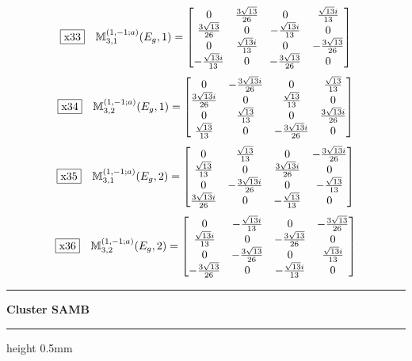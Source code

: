 \documentclass[fleqn,10pt,landscape]{jsarticle}
\begin{document}
\begin{dmath*}
\fbox{x33}\quad \mathbb{M}_{3,1}^{(1,-1;a)}(E_{g},1)=\begin{bmatrix} 0 & \frac{3 \sqrt{13}}{26} & 0 & \frac{\sqrt{13} i}{13} \\ \frac{3 \sqrt{13}}{26} & 0 & - \frac{\sqrt{13} i}{13} & 0 \\ 0 & \frac{\sqrt{13} i}{13} & 0 & - \frac{3 \sqrt{13}}{26} \\ - \frac{\sqrt{13} i}{13} & 0 & - \frac{3 \sqrt{13}}{26} & 0 \end{bmatrix}
\end{dmath*}
\begin{dmath*}
\fbox{x34}\quad \mathbb{M}_{3,2}^{(1,-1;a)}(E_{g},1)=\begin{bmatrix} 0 & - \frac{3 \sqrt{13} i}{26} & 0 & \frac{\sqrt{13}}{13} \\ \frac{3 \sqrt{13} i}{26} & 0 & \frac{\sqrt{13}}{13} & 0 \\ 0 & \frac{\sqrt{13}}{13} & 0 & \frac{3 \sqrt{13} i}{26} \\ \frac{\sqrt{13}}{13} & 0 & - \frac{3 \sqrt{13} i}{26} & 0 \end{bmatrix}
\end{dmath*}
\begin{dmath*}
\fbox{x35}\quad \mathbb{M}_{3,1}^{(1,-1;a)}(E_{g},2)=\begin{bmatrix} 0 & \frac{\sqrt{13}}{13} & 0 & - \frac{3 \sqrt{13} i}{26} \\ \frac{\sqrt{13}}{13} & 0 & \frac{3 \sqrt{13} i}{26} & 0 \\ 0 & - \frac{3 \sqrt{13} i}{26} & 0 & - \frac{\sqrt{13}}{13} \\ \frac{3 \sqrt{13} i}{26} & 0 & - \frac{\sqrt{13}}{13} & 0 \end{bmatrix}
\end{dmath*}
\begin{dmath*}
\fbox{x36}\quad \mathbb{M}_{3,2}^{(1,-1;a)}(E_{g},2)=\begin{bmatrix} 0 & - \frac{\sqrt{13} i}{13} & 0 & - \frac{3 \sqrt{13}}{26} \\ \frac{\sqrt{13} i}{13} & 0 & - \frac{3 \sqrt{13}}{26} & 0 \\ 0 & - \frac{3 \sqrt{13}}{26} & 0 & \frac{\sqrt{13} i}{13} \\ - \frac{3 \sqrt{13}}{26} & 0 & - \frac{\sqrt{13} i}{13} & 0 \end{bmatrix}
\end{dmath*}
\vspace{5mm}
\noindent \rule[0.5mm]{5mm}{0.5mm}\hspace{3mm}\textbf{Cluster SAMB}\hspace{3mm}\leaders\hrule height 0.5mm\hfill\kern0pt
\vspace{3mm}
\end{document}
